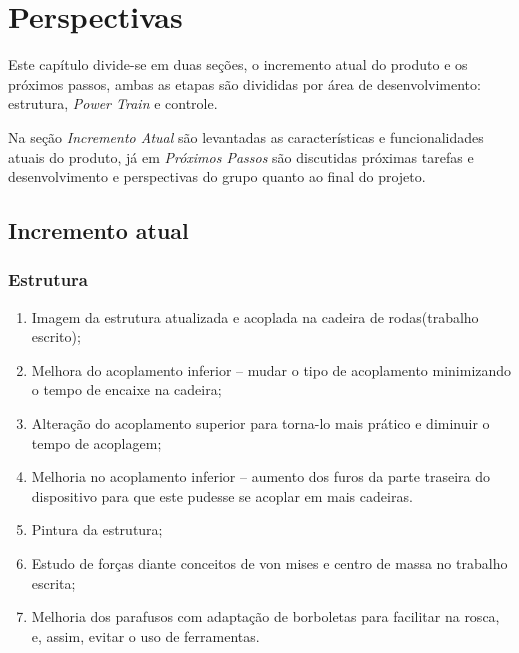 \chapter[Perspectivas]{Perspectivas}

Este capítulo divide-se em duas seções, o incremento atual do produto e os próximos passos, ambas as etapas são divididas por área de desenvolvimento: estrutura, \textit{Power Train} e controle.

Na seção \textit{Incremento Atual} são levantadas as características e funcionalidades atuais do produto, já em \textit{Próximos Passos} são discutidas próximas tarefas e desenvolvimento e perspectivas do grupo quanto ao final do projeto.

\section{Incremento atual}
  \subsection{Estrutura}
    \begin{enumerate}
      \item Imagem da estrutura  atualizada e acoplada na cadeira de rodas(trabalho escrito);
      \item Melhora do acoplamento inferior – mudar o tipo de acoplamento minimizando o tempo de encaixe na cadeira;
      \item Alteração do acoplamento superior para torna-lo mais prático e diminuir o tempo de acoplagem;
      \item Melhoria no acoplamento inferior – aumento dos furos da parte traseira do dispositivo para que este pudesse se acoplar em mais cadeiras.
      \item Pintura da estrutura;
      \item Estudo de forças diante conceitos de von mises e centro de massa no trabalho escrita;
    	\item Melhoria dos parafusos com adaptação de borboletas para facilitar na rosca, e, assim, evitar o uso de ferramentas.
    \end{enumerate}

